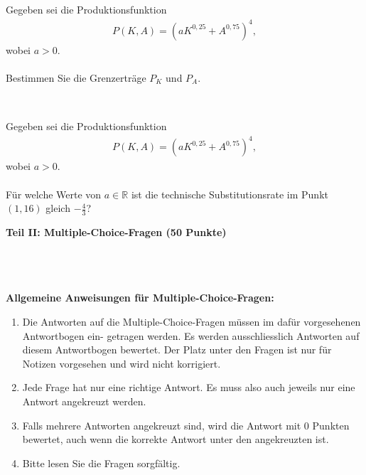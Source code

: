 \subsection*{}
Gegeben sei die Produktionsfunktion
\begin{align*}
P(K,A) = (a K^{0,25} + A^{0,75})^4,
\end{align*}
wobei $a > 0$.
\\
\\
Bestimmen Sie die Grenzerträge $P_K$ und $P_A$.
\\
\\
\subsection*{}
Gegeben sei die Produktionsfunktion
\begin{align*}
P(K,A) = (a K^{0,25} + A^{0,75})^4,
\end{align*}
wobei $a > 0$.\\
\\
Für welche Werte von $a \in \mathbb{R}$ ist die technische Substitutionsrate im Punkt $(1,16)$ gleich $-\frac{4}{3}$?

\newpage

\begin{Large}
\textbf{Teil II: Multiple-Choice-Fragen (50 Punkte)}
\end{Large}
\\
\\
\\
\textbf{Allgemeine Anweisungen für Multiple-Choice-Fragen:}
\\
\renewcommand{\labelenumi}{(\roman{enumi})}
\begin{enumerate}
\item
Die Antworten auf die Multiple-Choice-Fragen müssen im dafür vorgesehenen Antwortbogen ein-
getragen werden. Es werden ausschliesslich Antworten auf diesem Antwortbogen bewertet. Der
Platz unter den Fragen ist nur für Notizen vorgesehen und wird nicht korrigiert.

\item
Jede Frage hat nur eine richtige Antwort. Es muss also auch jeweils nur eine Antwort angekreuzt
werden.

\item
Falls mehrere Antworten angekreuzt sind, wird die Antwort mit 0 Punkten bewertet, auch wenn
die korrekte Antwort unter den angekreuzten ist.

\item
Bitte lesen Sie die Fragen sorgfältig.

\end{enumerate}


